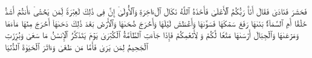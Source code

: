 \stopbuffer
\startbuffer[\q:79:23]
فَحَشَرَ فَنَادَىٰ%
\stopbuffer
\startbuffer[\q:79:24]
فَقَالَ أَنَا۠ رَبُّكُمُ ٱلۡأَعۡلَىٰ%
\stopbuffer
\startbuffer[\q:79:25]
فَأَخَذَهُ ٱللَّهُ نَكَالَ ٱلۡءَاخِرَةِ وَٱلۡأُولَىٰۤ%
\stopbuffer
\startbuffer[\q:79:26]
إِنَّ فِی ذَٰلِكَ لَعِبۡرَةࣰ لِّمَن یَخۡشَىٰۤ%
\stopbuffer
\startbuffer[\q:79:27]
ءَأَنتُمۡ أَشَدُّ خَلۡقًا أَمِ ٱلسَّمَاۤءُۚ بَنَىٰهَا%
\stopbuffer
\startbuffer[\q:79:28]
رَفَعَ سَمۡكَهَا فَسَوَّىٰهَا%
\stopbuffer
\startbuffer[\q:79:29]
وَأَغۡطَشَ لَیۡلَهَا وَأَخۡرَجَ ضُحَىٰهَا%
\stopbuffer
\startbuffer[\q:79:30]
وَٱلۡأَرۡضَ بَعۡدَ ذَٰلِكَ دَحَىٰهَاۤ%
\stopbuffer
\startbuffer[\q:79:31]
أَخۡرَجَ مِنۡهَا مَاۤءَهَا وَمَرۡعَىٰهَا%
\stopbuffer
\startbuffer[\q:79:32]
وَٱلۡجِبَالَ أَرۡسَىٰهَا%
\stopbuffer
\startbuffer[\q:79:33]
مَتَٰعࣰا لَّكُمۡ وَ لِأَنۡعَٰمِكُمۡ%
\stopbuffer
\startbuffer[\q:79:34]
فَإِذَا جَاۤءَتِ ٱلطَّاۤمَّةُ ٱلۡكُبۡرَىٰ%
\stopbuffer
\startbuffer[\q:79:35]
یَوۡمَ یَتَذَكَّرُ ٱلۡإِنسَٰنُ مَا سَعَىٰ%
\stopbuffer
\startbuffer[\q:79:36]
وَبُرِّزَتِ ٱلۡجَحِیمُ لِمَن یَرَىٰ%
\stopbuffer
\startbuffer[\q:79:37]
فَأَمَّا مَن طَغَىٰ%
\stopbuffer
\startbuffer[\q:79:38]
وَءَاثَرَ ٱلۡحَیَوٰةَ ٱلدُّنۡیَا%
\stopbuffer
